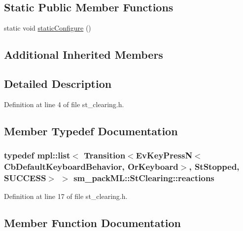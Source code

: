 \subsection*{Static Public Member Functions}
\begin{DoxyCompactItemize}
\item 
static void \hyperlink{structsm__packML_1_1StClearing_acd7cf3e047cae7daba192b77210b5591}{static\+Configure} ()
\end{DoxyCompactItemize}
\subsection*{Additional Inherited Members}


\subsection{Detailed Description}


Definition at line 4 of file st\+\_\+clearing.\+h.



\subsection{Member Typedef Documentation}
\subsubsection[{\texorpdfstring{reactions}{reactions}}]{\setlength{\rightskip}{0pt plus 5cm}typedef mpl\+::list$<$ Transition$<$Ev\+Key\+PressN$<$Cb\+Default\+Keyboard\+Behavior, {\bf Or\+Keyboard}$>$, {\bf St\+Stopped}, {\bf S\+U\+C\+C\+E\+SS}$>$ $>$ {\bf sm\+\_\+pack\+M\+L\+::\+St\+Clearing\+::reactions}}\hypertarget{structsm__packML_1_1StClearing_a94075db172b4e30d02ec9d5d93216ab3}{}\label{structsm__packML_1_1StClearing_a94075db172b4e30d02ec9d5d93216ab3}


Definition at line 17 of file st\+\_\+clearing.\+h.



\subsection{Member Function Documentation}
